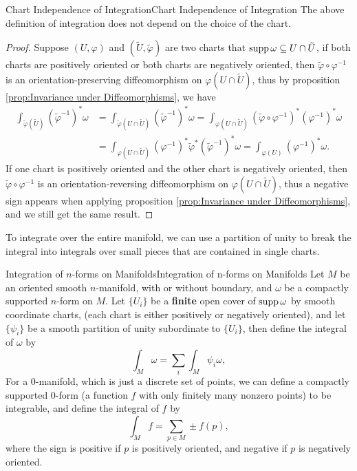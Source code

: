 \documentclass[../main.tex]{subfiles}
\begin{document}
\begin{proposition}{Chart Independence of Integration}{Chart Independence of Integration}
  The above definition of integration does not depend on the choice of the chart.
\end{proposition}
\begin{proof}
  Suppose $(U,\varphi)$ and $(\tilde{U},\tilde{\varphi})$ are two charts that $\operatorname{supp} \omega \subseteq U\cap \tilde{U}$, if both charts are positively oriented or both charts are negatively oriented, then $\tilde{\varphi}\circ \varphi^{-1}$ is an orientation-preserving diffeomorphism on $\varphi(U\cap \tilde{U})$, thus by proposition \ref{prop:Invariance under Diffeomorphisms}, we have
  \begin{equation*}
    \begin{aligned}
      \int_{\tilde{\varphi}(\tilde{U})} (\tilde{\varphi}^{-1})^*\omega &= \int_{\tilde{\varphi}(U \cap \tilde{U})} (\tilde{\varphi}^{-1})^*\omega = \int_{\varphi(U \cap \tilde{U})} (\tilde{\varphi}\circ \varphi^{-1})^* (\varphi^{-1})^*\omega\\
      &= \int_{\varphi(U\cap \tilde{U})} (\varphi^{-1})^* \tilde{\varphi}^* (\tilde{\varphi}^{-1})^*\omega = \int_{\varphi(U)} (\varphi^{-1})^*\omega.
    \end{aligned}
  \end{equation*}
  If one chart is positively oriented and the other chart is negatively oriented, then $\tilde{\varphi}\circ \varphi^{-1}$ is an orientation-reversing diffeomorphism on $\varphi(U\cap \tilde{U})$, thus a negative sign appears when applying proposition \ref{prop:Invariance under Diffeomorphisms}, and we still get the same result.
\end{proof}

To integrate over the entire manifold, we can use a partition of unity to break the integral into integrals over small pieces that are contained in single charts.

\begin{definition}{Integration of $n$-forms on Manifolds}{Integration of n-forms on Manifolds}
  Let $M$ be an oriented smooth $n$-manifold, with or without boundary, and $\omega$ be a compactly supported $n$-form on $M$. Let $\{U_i\}$ be a \textbf{finite} open cover of $\operatorname{supp} \omega$ by smooth coordinate charts, (each chart is either positively or negatively oriented), and let $\{\psi_i\}$ be a smooth partition of unity subordinate to $\{U_i\}$, then define the integral of $\omega$ by
  \begin{equation}
    \int_M \omega = \sum_i \int_M \psi_i \omega,
  \end{equation}
  For a 0-manifold, which is just a discrete set of points, we can define a compactly supported 0-form (a function $f$ with only finitely many nonzero points) to be integrable, and define the integral of $f$ by
  \begin{equation}
    \int_M f = \sum_{p\in M} \pm f(p),
  \end{equation}
  where the sign is positive if $p$ is positively oriented, and negative if $p$ is negatively oriented.
\end{definition}
\end{document}
